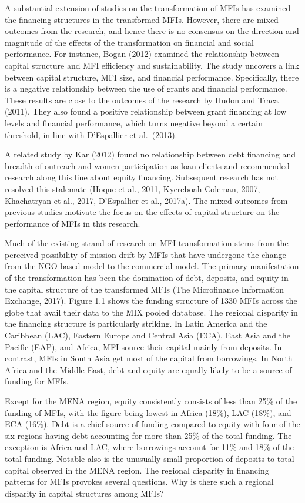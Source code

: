 \documentclass[a4paper, nobind]{templates/ociamthesis}
\begin{document}
A substantial extension of studies on the transformation of MFIs has examined the financing structures in the transformed MFIs. However, there are mixed outcomes from the research, and hence there is no consensus on the direction and magnitude of the effects of the transformation on financial and social performance. For instance, Bogan (2012) examined the relationship between capital structure and MFI efficiency and sustainability. The study uncovers a link between capital structure, MFI size, and financial performance. Specifically, there is a negative relationship between the use of grants and financial performance. These results are close to the outcomes of the research by Hudon and Traca (2011). They also found a positive relationship between grant financing at low levels and financial performance, which turns negative beyond a certain threshold, in line with D'Espallier et al.~(2013).

A related study by Kar (2012) found no relationship between debt financing and breadth of outreach and women participation as loan clients and recommended research along this line about equity financing. Subsequent research has not resolved this stalemate (Hoque et al., 2011, Kyereboah-Coleman, 2007, Khachatryan et al., 2017, D'Espallier et al., 2017a). The mixed outcomes from previous studies motivate the focus on the effects of capital structure on the performance of MFIs in this research.

Much of the existing strand of research on MFI transformation stems from the perceived possibility of mission drift by MFIs that have undergone the change from the NGO based model to the commercial model. The primary manifestation of the transformation has been the domination of debt, deposits, and equity in the capital structure of the transformed MFIs (The Microfinance Information Exchange, 2017). Figure 1.1 shows the funding structure of 1330 MFIs across the globe that avail their data to the MIX pooled database. The regional disparity in the financing structure is particularly striking. In Latin America and the Caribbean (LAC), Eastern Europe and Central Asia (ECA), East Asia and the Pacific (EAP), and Africa, MFI source their capital mainly from deposits. In contrast, MFIs in South Asia get most of the capital from borrowings. In North Africa and the Middle East, debt and equity are equally likely to be a source of funding for MFIs.

Except for the MENA region, equity consistently consists of less than 25\% of the funding of MFIs, with the figure being lowest in Africa (18\%), LAC (18\%), and ECA (16\%). Debt is a chief source of funding compared to equity with four of the six regions having debt accounting for more than 25\% of the total funding. The exception is Africa and LAC, where borrowings account for 11\% and 18\% of the total funding. Notable also is the unusually small proportion of deposits to total capital observed in the MENA region. The regional disparity in financing patterns for MFIs provokes several questions. Why is there such a regional disparity in capital structures among MFIs?
\end{document}
